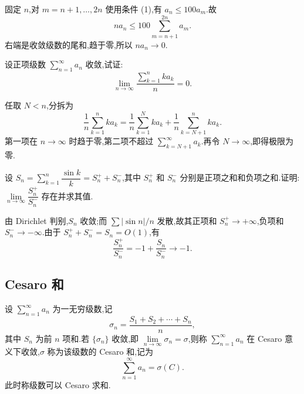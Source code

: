 \begin{solution}
    固定 $n$,对 $m=n+1,\ldots,2n$ 使用条件 (1),有 $a_n\leq100a_m$.故
    \[
        na_n\leq100\sum\limits_{m=n+1}^{2n}a_m.
    \]
    右端是收敛级数的尾和,趋于零,所以 $na_n\to0$.
\end{solution}

\begin{example}[\markstar]
    设正项级数 $\displaystyle\sum\limits_{n=1}^{\infty}a_n$ 收敛,试证:
    \[
        \displaystyle\lim\limits_{n\to\infty}\dfrac{\displaystyle\sum\limits_{k=1}^nka_k}{n}=0.
    \]
\end{example}
\exampleblank

\begin{solution}
    任取 $N<n$,分拆为
    \[
        \dfrac{1}{n}\sum\limits_{k=1}^{n}ka_k
        =\dfrac{1}{n}\sum\limits_{k=1}^{N}ka_k
        +\dfrac{1}{n}\sum\limits_{k=N+1}^{n}ka_k.
    \]
    第一项在 $n\to\infty$ 时趋于零,第二项不超过
    $\displaystyle \sum_{k=N+1}^{\infty}a_k$.再令 $N\to\infty$,即得极限为零.
\end{solution}

\begin{example}
    设 $\displaystyle S_n=\sum\limits_{k=1}^n\dfrac{\sin k}{k}=S_n^++S_n^-$,其中 $S_n^+$ 和 $S_n^-$ 分别是正项之和和负项之和.证明:$\displaystyle\lim\limits_{n\to\infty}\dfrac{S_n^+}{S_n^-}$ 存在并求其值.
\end{example}
\exampleblank

\begin{solution}
    由 Dirichlet 判别,$S_n$ 收敛;而 $\displaystyle \sum|\sin n|/n$ 发散,故其正项和
    $S_n^+\to+\infty$,负项和 $S_n^-\to-\infty$.由于
    $S_n^++S_n^-=S_n=O(1)$,有
    \[
        \dfrac{S_n^+}{S_n^-}
        =-1+\dfrac{S_n}{S_n^-}\longrightarrow\boxed{-1}.
    \]
\end{solution}



\subsection{Cesaro 和}

\begin{definition}
    设 $\displaystyle\sum\limits_{n=1}^{\infty}a_n$ 为一无穷级数,记
    \[
        \sigma_n=\dfrac{S_1+S_2+\cdots+S_n}{n},
    \]
    其中 $S_n$ 为前 $n$ 项和.若 $\{\sigma_n\}$ 收敛,即 $\displaystyle\lim\limits_{n\to\infty}\sigma_n=\sigma$,则称 $\displaystyle\sum\limits_{n=1}^{\infty}a_n$ 在 Cesaro 意义下收敛,$\sigma$ 称为该级数的 Cesaro 和,记为
    \[
        \displaystyle\sum\limits_{n=1}^{\infty}a_n=\sigma(C).
    \]
    此时称级数可以 Cesaro 求和.
\end{definition}

